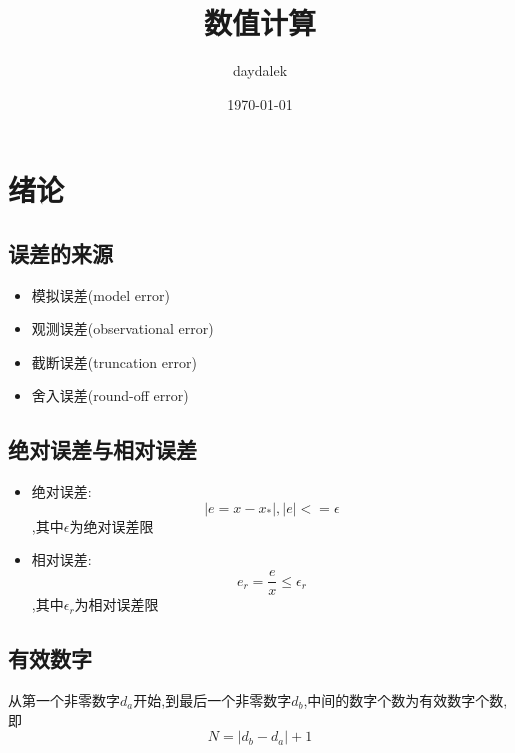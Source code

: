 \documentclass{ctexart}
\begin{document}
\title{数值计算}
\author{daydalek}
\date{\today}
\maketitle
\section{绪论}
\subsection{误差的来源}
\begin{itemize}
    \item 模拟误差(model error)
    \item 观测误差(observational error)
    \item 截断误差(truncation error)
    \item 舍入误差(round-off error)
\end{itemize}

\subsection{绝对误差与相对误差}
\begin{itemize}
    \item 绝对误差: \begin{equation}|e=x-x_*|,|e|<=\epsilon \end{equation},其中$\epsilon$为绝对误差限
    \item 相对误差: \begin{equation}e_r=\frac{e}{x}\leq \epsilon_r \end{equation},其中$\epsilon_r$为相对误差限
\end{itemize}
\subsection{有效数字}
从第一个非零数字$d_a$开始,到最后一个非零数字$d_b$,中间的数字个数为有效数字个数,即  \begin{equation}N=|d_b-d_a|+1\end{equation}
\end{document}
